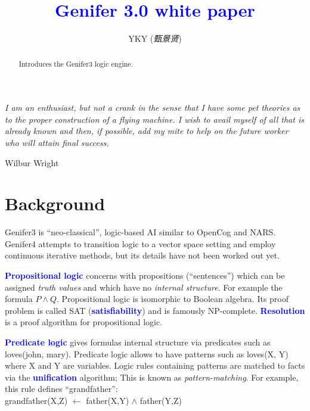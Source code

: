 \documentclass[12pt]{article}
\title{\textcolor{blue}{Genifer 3.0 white paper}}
\author{YKY (\textit{甄景贤})}
\newcommand{\concept}[1]{\textbf{\textcolor{blue}{#1}}}
\newcommand{\formula}[1]{\ttfamily\textcolor{LogicColor}{#1}\rmfamily}
\newcommand{\tab}{\hspace*{1cm}}
\begin{document}
\tab\tab\tab \parbox{11cm}{\textit{I am an enthusiast, but not a crank in the sense that I have some pet theories as to the proper construction of a flying machine. I wish to avail myself of all that is already known and then, if possible, add my mite to help on the future worker who will attain final success.}}
\vspace{-0.5cm}
\begin{flushright}
\textemdash Wilbur Wright
\end{flushright}

\sffamily

{\let\newpage\relax\maketitle}

\maketitle
\setlength{\parindent}{0em}
\setlength{\parskip}{1.5ex plus0.5ex minus1.2ex}

\begin{abstract}
\noindent Introduces the Genifer3 logic engine.
\end{abstract}

\section{Background}

Genifer3 is ``neo-classical'', logic-based AI similar to OpenCog and NARS.  Genifer4 attempts to transition logic to a vector space setting and employ continuous iterative methods, but its details have not been worked out yet.

\concept{Propositional logic} concerns with propositions (``sentences'') which can be assigned \textit{truth values} and which have no \textit{internal structure}.  For example the formula $P \wedge Q$.  Propositional logic is isomorphic to Boolean algebra.  Its proof problem is called SAT (\concept{satisfiability}) and is famously NP-complete.  \concept{Resolution} is a proof algorithm for propositional logic.

\concept{Predicate logic} gives formulas internal structure via predicates such as \formula{loves(john, mary)}.  Predicate logic allows to have patterns such as \formula{loves(X, Y)} where X and Y are variables.  Logic rules containing patterns are matched to facts via the \concept{unification} algorithm;  This is known as \textit{pattern-matching}.  For example, this rule defines ``grandfather'':\\
\tab\formula{grandfather(X,Z) $\leftarrow$ father(X,Y) $\wedge$ father(Y,Z)}\\
\end{document}

